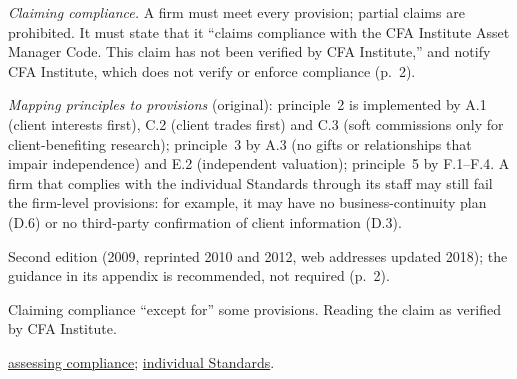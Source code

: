 \begin{qfdefinition}
\emph{Claiming compliance.} A firm must meet every provision; partial claims are prohibited. It must state that it ``claims compliance with the CFA Institute Asset Manager Code. This claim has not been verified by CFA Institute,'' and notify CFA Institute, which does not verify or enforce compliance (p.~2).

 \emph{Mapping principles to provisions} (original): principle~2 is implemented by A.1 (client interests first), C.2 (client trades first) and C.3 (soft commissions only for client-benefiting research); principle~3 by A.3 (no gifts or relationships that impair independence) and E.2 (independent valuation); principle~5 by F.1--F.4. A firm that complies with the individual Standards through its staff may still fail the firm-level provisions: for example, it may have no business-continuity plan (D.6) or no third-party confirmation of client information (D.3).

 Second edition (2009, reprinted 2010 and 2012, web addresses updated 2018); the guidance in its appendix is recommended, not required (p.~2).

 Claiming compliance ``except for'' some provisions. Reading the claim as verified by CFA Institute.

 \hyperref[meth:asset-manager-code-compliance]{assessing compliance}; \hyperref[def:code-of-ethics-standards]{individual Standards}.

\end{qfdefinition}

